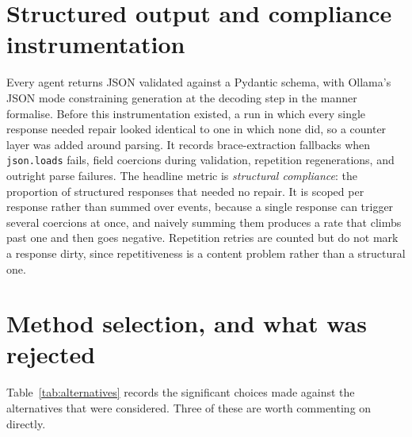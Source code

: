 \section{Structured output and compliance instrumentation}
\label{sec:compliance-method}

Every agent returns JSON validated against a Pydantic schema, with Ollama's JSON
mode constraining generation at the decoding step in the manner
\citet{willard2023guided} formalise. Before this
instrumentation existed, a run in which every single response needed repair
looked identical to one in which none did, so a counter layer was added around
parsing. It records brace-extraction fallbacks when \texttt{json.loads} fails,
field coercions during validation, repetition regenerations, and outright parse
failures. The headline metric is \emph{structural compliance}: the proportion of
structured responses that needed no repair. It is scoped per response
rather than summed over events, because a single response can trigger several
coercions at once, and naively summing them produces a rate that climbs past one
and then goes negative. Repetition retries are counted but do not mark a response
dirty, since repetitiveness is a content problem rather than a structural one.

\section{Method selection, and what was rejected}
\label{sec:alternatives}

Table~\ref{tab:alternatives} records the significant choices made against the
alternatives that were considered. Three of these are worth commenting on
directly.

